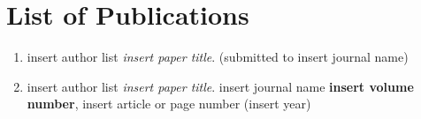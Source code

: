 \chapter{List of Publications}

\begin{enumerate}
\item insert author list \emph{insert paper title}.  (submitted to
	insert journal name)
\item insert author list \emph{insert paper title}.
        insert journal name \textbf{insert volume number}, 
        insert article or page number (insert year)
\end{enumerate}
